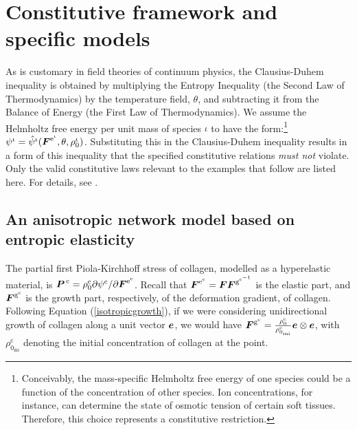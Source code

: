 \section{Constitutive framework and specific models}
\label{sec:3}

As is customary in field theories of continuum physics, the
Clausius-Duhem inequality is obtained by multiplying the Entropy
Inequality (the Second Law of Thermodynamics) by the temperature
field, $\theta$, and subtracting it from the Balance of Energy (the
First Law of Thermodynamics). We assume the Helmholtz free energy per
unit mass of species $\iota$ to have the form:\footnote{Conceivably,
  the mass-specific Helmholtz free energy of one species could be a function of the
  concentration of other species. Ion concentrations, for instance,
  can determine the state of osmotic tension of certain soft
  tissues. Therefore, this choice represents a 
  constitutive restriction.}
$\psi^{\iota} = \hat{\psi}^\iota(\mbox{\boldmath$ F$}^{\mathrm{e}^\iota},
\theta, \rho_0^\iota)$.  Substituting this in the Clausius-Duhem
inequality results in a form of this inequality that the specified
constitutive relations \emph{must not} violate. Only the valid
constitutive laws relevant to the examples that follow are listed
here. For details, see \cite{growthpaper}.

\subsection{An anisotropic network model based on entropic
elasticity}\label{wlcm}


The partial first Piola-Kirchhoff stress of collagen, modelled as a
hyperelastic material, is $\mbox{\boldmath$ P$}^{\,\mathrm{c}} = \rho_0^\mathrm{c} \partial
\psi^\mathrm{c}/ \partial\mbox{\boldmath$ F$}^{\mathrm{e}^\mathrm{c}}$. Recall that
$\mbox{\boldmath$ F$}^{\mathrm{e}^\mathrm{c}} = \mbox{\boldmath$ F$}\mbox{\boldmath$ F$}^{\mathrm{g}^{\mathrm{c}^{-1}}}$
is the elastic part, and
$\mbox{\boldmath$ F$}^{\mathrm{g}^\mathrm{c}}$ 
is the growth part, respectively, of the deformation gradient, of
collagen. Following Equation 
(\ref{isotropicgrowth}), if we were considering unidirectional growth
of collagen along a unit vector $\mbox{\boldmath$ e$}$, we would have
$\mbox{\boldmath$ F$}^{\mathrm{g}^\mathrm{c}} = \frac{\rho^\mathrm{c}_{0}}
{\rho^\mathrm{c}_{0_{\mathrm{ini}}}} \mbox{\boldmath$ e$} \otimes \mbox{\boldmath$ e$}$, with
$\rho^\mathrm{c}_{0_{\mathrm{ini}}}$ denoting the initial
concentration of collagen at the point.

